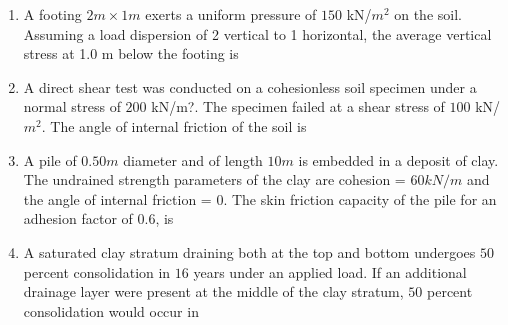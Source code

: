 \documentclass[journal]{IEEEtran}
\begin{document}
\begin{enumerate}
\item A footing $2 m \times 1 m$ exerts a uniform pressure of $150$ kN/$m^{2}$ on the soil. Assuming a load
dispersion of 2 vertical to 1 horizontal, the average vertical stress  at 1.0 m below the
footing is \hfill {}

\begin{enumerate}
\end{enumerate}

\item A direct shear test was conducted on a cohesionless soil  specimen under a normal stress of $200$ kN/m?. The specimen failed at a shear stress of $100$ kN/$m^{2}$. The angle of internal friction of the soil  is \hfill {}

\begin{enumerate}
\end{enumerate}

\item A pile of $0.50 m$ diameter and of length $10 m$ is embedded in a deposit of clay. The undrained strength parameters of the clay are cohesion = $60 kN/m$ and the angle of internal friction = $0$. The skin friction capacity  of the pile for an adhesion factor of $0.6$, is \hfill {}

\begin{enumerate}
\end{enumerate}

\item A saturated clay stratum draining both at the top and bottom undergoes $50$ percent consolidation in $16$ years under an applied load. If an additional drainage layer were present at the middle of the clay stratum, $50$ percent consolidation would occur in \hfill {}


\end{enumerate}
\end{document}
